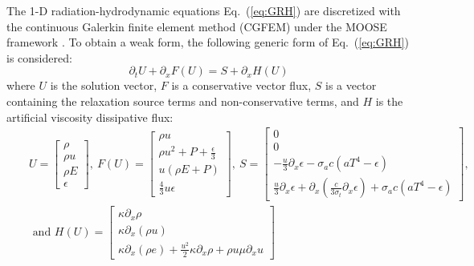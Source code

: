 \documentclass[review]{elsarticle}
\newcommand{\eqt}[1]{Eq.~(\ref{#1})}                     %
\begin{document}
The 1-D radiation-hydrodynamic equations \eqt{eq:GRH} are discretized with the continuous Galerkin finite element method (CGFEM) under the MOOSE framework \cite{Moose}. To obtain a weak form, the following generic form of \eqt{eq:GRH} is considered:
\begin{equation}
\label{eq:form}
\partial_t U + \partial_x F \left( U \right) = S + \partial_x H \left(U\right)
\end{equation}
where $U$ is the solution vector, $F$ is a conservative vector flux, $S$ is a vector containing the relaxation source terms and non-conservative terms, and $H$ is the artificial viscosity dissipative flux:
\begin{eqnarray*}
&&U = 
\begin{bmatrix}
\rho \\
\rho u \\
\rho E \\
\epsilon
\end{bmatrix}
,\
F(U) = 
\begin{bmatrix}
\rho u \\
\rho u^2 + P + \frac{\epsilon}{3} \\
u \left( \rho E + P \right) \\
\frac{4}{3} u \epsilon
\end{bmatrix}
,\
S = 
\begin{bmatrix}
0 \\
0 \\
-\frac{u}{3} \partial_x \epsilon - \sigma_a c \left( a T^4 - \epsilon \right) \\
\frac{u}{3} \partial_x \epsilon + \partial_x \left( \frac{c}{3 \sigma_t} \partial_x \epsilon \right) + \sigma_a c \left( a T^4 - \epsilon \right)
\end{bmatrix}
,
\\
&&\text{ and } 
H(U) = 
\begin{bmatrix}
\kappa \partial_x \rho \\
\kappa \partial_x (\rho u) \\
\kappa \partial_x \left( \rho e \right) + \frac{u^2}{2} \kappa \partial_x \rho + \rho u \mu \partial_x u
\end{bmatrix}
\end{eqnarray*}
\end{document}
